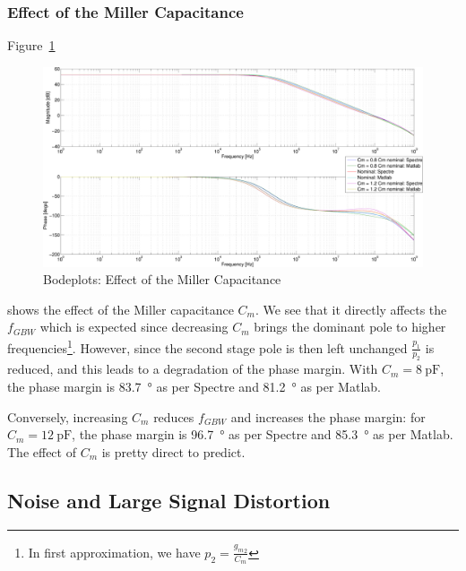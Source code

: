 \documentclass[english,10pt]{article}
\begin{document}
\subsubsection{Effect of the Miller Capacitance}
Figure~\ref{fig:cm}
\begin{figure}[htbp]
  \centering
  \includegraphics[width = \textwidth]{6_4.pdf}
  \caption{Bodeplots: Effect of the Miller Capacitance\label{fig:cm}}
\end{figure}
shows the effect of the Miller capacitance $C_m$. We see that it directly affects the $f_{GBW}$ which is expected since decreasing $C_m$ brings the dominant pole to higher frequencies\footnote{In first approximation, we have $p_2 = \frac{{g_m}_2}{C_m}$}. However, since the second stage pole is then left unchanged $\frac{p_1}{p_2}$ is reduced, and this leads to a degradation of the phase margin. With $C_m = \SI{8}{\pico\farad}$, the phase margin is \SI{83.7}{\degree} as per Spectre and \SI{81.2}{\degree} as per Matlab.

Conversely, increasing $C_m$ reduces $f_{GBW}$ and increases the phase margin: for $C_m = \SI{12}{\pico\farad}$, the phase margin is \SI{96.7}{\degree} as per Spectre and \SI{85.3}{\degree} as per Matlab. The effect of $C_m$ is pretty direct to predict.

\subsection{Noise and Large Signal Distortion}
\end{document}
